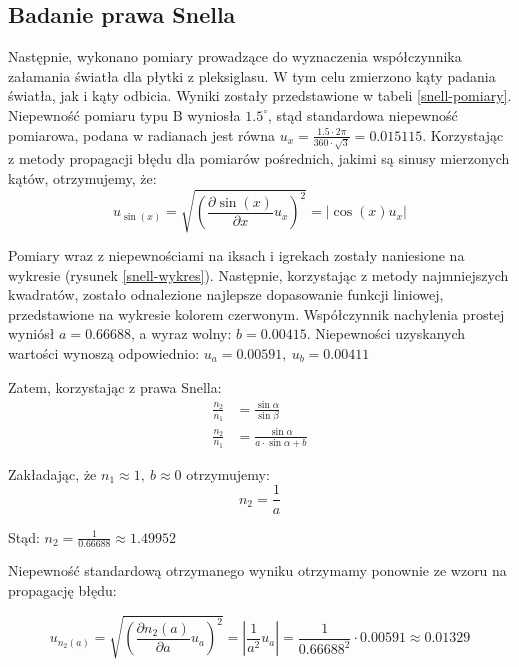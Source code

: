 \documentclass[a4paper]{article}
\newlength{\du}
\begin{document}
\subsection{Badanie prawa Snella}
Następnie, wykonano pomiary prowadzące do wyznaczenia współczynnika załamania światła dla płytki z pleksiglasu.
W tym celu zmierzono kąty padania światła, jak i kąty odbicia.
Wyniki zostały przedstawione w tabeli \ref{snell-pomiary}.
Niepewność pomiaru typu B wyniosła $1.5^\circ$, stąd standardowa niepewność pomiarowa, podana w radianach jest równa $u_x = \frac{1.5 \cdot 2 \pi}{360 \cdot \sqrt{3}} = 0.015115$.
Korzystając z metody propagacji błędu dla pomiarów pośrednich, jakimi są sinusy mierzonych kątów, otrzymujemy, że:
\[
	u_{\sin(x)} = \sqrt{\left(\frac{\partial \sin(x)}{\partial x}u_{x}\right)^2} = \left|\cos(x)u_{x}\right|
\]

Pomiary wraz z niepewnościami na iksach i igrekach zostały naniesione na wykresie (rysunek \ref{snell-wykres}).
Następnie, korzystając z metody najmniejszych kwadratów, zostało odnalezione najlepsze dopasowanie funkcji liniowej, przedstawione na wykresie kolorem czerwonym.
Współczynnik nachylenia prostej wyniósł $a = 0.66688$, a wyraz wolny: $b = 0.00415$.
Niepewności uzyskanych wartości wynoszą odpowiednio:
$ u_a=0.00591, \ u_b=0.00411 $

Zatem, korzystając z prawa Snella:
\begin{align*}
\frac{n_2}{n_1} &= \frac{\sin\alpha}{\sin\beta} \\ 
\frac{n_2}{n_1} &= \frac{\sin\alpha}{a \cdot \sin\alpha + b}
\end{align*}

Zakładając, że $n_1 \approx 1, \ b \approx 0$ otrzymujemy:
\[ n_2 = \frac{1}{a}\]

Stąd: $n_2 = \frac{1}{0.66688} \approx 1.49952$

Niepewność standardową otrzymanego wyniku otrzymamy ponownie ze wzoru na propagację błędu:

\[
		u_{n_2(a)} = \sqrt{\left(\frac{\partial n_2(a)}{\partial a}u_{a}\right)^2} = 
		\left| \frac{1}{a^2} u_{a}\right| = \frac{1}{0.66688^2}\cdot 0.00591 \approx 0.01329
\]
\end{document}
